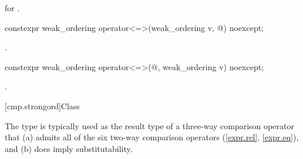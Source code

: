 \begin{itemdescr}
\pnum
\returns
{} for .
\end{itemdescr}

%
\begin{itemdecl}
constexpr weak_ordering operator<=>(weak_ordering v, @\unspec@) noexcept;
\end{itemdecl}

\begin{itemdescr}
\pnum
\returns
{}.
\end{itemdescr}

%
\begin{itemdecl}
constexpr weak_ordering operator<=>(@\unspec@, weak_ordering v) noexcept;
\end{itemdecl}

\begin{itemdescr}
\pnum
\returns
{}.
\end{itemdescr}

[cmp.strongord]{Class }

\pnum
The  type is typically used
as the result type of a three-way comparison operator
that (a) admits all of the six two-way comparison operators (\ref{expr.rel}, \ref{expr.eq}),
and (b) does imply substitutability.

